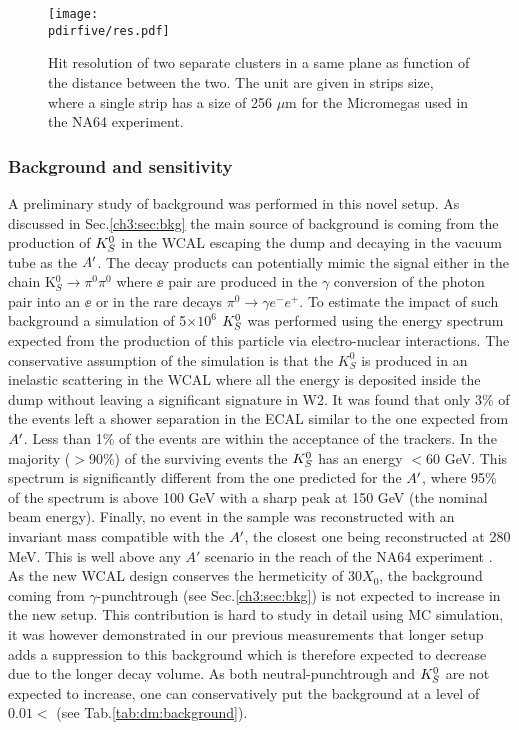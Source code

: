 \begin{figure}[tbh!]
  \centering
  \texttt{[image: \\pdirfive/res.pdf]}
  \caption[hit resolution as function of the two cluster distance]{Hit resolution of two separate clusters in a same plane as function of the distance between the two. The unit are given in strips size, where a single strip has a size of 256 $\mu$m for the Micromegas used in the NA64 experiment.}
  \label{fig:res-hit}
\end{figure}

\subsubsection{Background and sensitivity}
\label{ch5:sec:background-sensitivity}

A preliminary study of background was performed in this novel setup. As discussed in Sec.\ref{ch3:sec:bkg} the main source of background is coming from the production of $K^0_S$ in the WCAL escaping the dump and decaying in the vacuum tube as the $A'$. The decay products can potentially mimic the signal either in the chain K$^0_S \rightarrow \pi^0 \pi^0$ where $\ee$ pair are produced in the $\gamma$ conversion of the photon pair into an $\ee$ or in the rare decays $\pi^0 \rightarrow \gamma e^- e^+$. To estimate the impact of such background a simulation of 5$\times 10^6$ $K^0_S$ was performed using the energy spectrum expected from the production of this particle via electro-nuclear interactions.
The conservative assumption of the simulation is that the $K^0_S$ is produced in an inelastic scattering in the WCAL where all the energy is deposited inside the dump without leaving a significant signature in W2. It was found that only 3\% of the events left a shower separation in the ECAL similar to the one expected from $A'$. Less than 1\% of the events are within the acceptance of the trackers. In the majority ($>$90\%) of the surviving events the $K^0_S$ has an energy $<$60 GeV. This spectrum is significantly different from the one predicted for the $A'$, where 95\% of the spectrum is above 100 GeV with a sharp peak at 150 GeV (the nominal beam energy). Finally, no event in the sample was reconstructed with an invariant mass compatible with the $A'$, the closest one being reconstructed at 280 MeV. This is well above any $A'$ scenario in the reach of the NA64 experiment \cite{Banerjee:2019hmi}. As the new WCAL design conserves the hermeticity of 30$X_0$, the background coming from $\gamma$-punchtrough (see Sec.\ref{ch3:sec:bkg}) is not expected to increase in the new setup. This contribution is hard to study in detail using MC simulation, it was however demonstrated in our previous measurements \cite{Banerjee:2019hmi} that longer setup adds a suppression to this background which is therefore expected to decrease due to the longer decay volume. As both neutral-punchtrough and $K^0_S$ are not expected to increase, one can conservatively put the background at a level of $0.01<$ (see Tab.\ref{tab:dm:background}).

